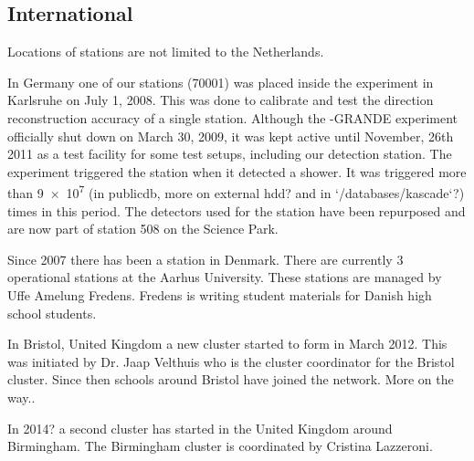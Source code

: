 \subsection{International}

Locations of \hisparc stations are not limited to the Netherlands.

In Germany one of our stations (70001) was placed inside the \kascade experiment in Karlsruhe on July 1, 2008. This was done to calibrate and test the direction reconstruction accuracy of a single \hisparc station. Although the \kascade-GRANDE \cite{kascade:grande} experiment officially shut down on March 30, 2009, it was kept active until November, 26th 2011 as a test facility for some test setups, including our detection station. The \kascade experiment \cite{kascade:experiment} triggered the \hisparc station when it detected a shower. It was triggered more than \num{9e7} (in publicdb, more on external hdd? and in `/databases/kascade`?) times in this period. The detectors used for the \kascade station have been repurposed and are now part of station 508 on the Science Park.

Since 2007 there has been a \hisparc station in Denmark. There are currently 3 operational stations at the Aarhus University. These stations are managed by Uffe Amelung Fredens. Fredens is writing student materials for Danish high school students.

In Bristol, United Kingdom a new cluster started to form in March 2012. This was initiated by Dr. Jaap Velthuis who is the cluster coordinator for the Bristol cluster. Since then schools around Bristol have joined the network. More on the way..

In 2014? a second cluster has started in the United Kingdom around Birmingham. The Birmingham cluster is coordinated by Cristina Lazzeroni.
